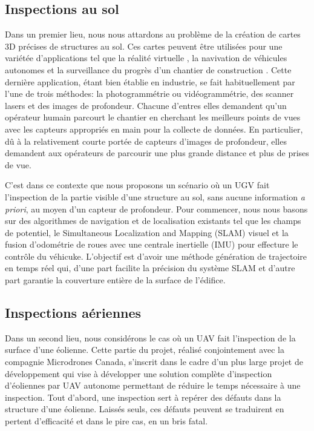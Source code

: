 \subsection{Inspections au sol}
Dans un premier lieu, nous nous attardons au problème de la création de cartes 3D précises de structures au sol. Ces cartes peuvent être utilisées pour une variétée d'applications tel que la réalité virtuelle \citep{googlevr2017}, la navivation de véhicules autonomes \citep{deepmap2017} et la surveillance du progrès d'un chantier de construction \citep{Omar2018}. Cette dernière application, étant bien établie en industrie, se fait habituellement par l'une de trois méthodes: la photogrammétrie ou vidéogrammétrie, des scanner lasers et des images de profondeur. Chacune d'entres elles demandent qu'un opérateur humain parcourt le chantier en cherchant les meilleurs points de vues avec les capteurs appropriés en main pour la collecte de données. En particulier, dû à la relativement courte portée de capteurs d'images de profondeur, elles demandent aux opérateurs de parcourir une plus grande distance et plus de prises de vue.

C'est dans ce contexte que nous proposons un scénario où un UGV fait l'inspection de la partie visible d'une structure au sol, sans aucune information \textit{a priori}, au moyen d'un capteur de profondeur. Pour commencer, nous nous basons sur des algorithmes de navigation et de localisation existants tel que les champs de potentiel, le Simultaneous Localization and Mapping (SLAM) visuel et la fusion d'odométrie de roues avec une centrale inertielle (IMU) pour effecture le contrôle du véhicuke. L'objectif est d'avoir une méthode génération de trajectoire en temps réel qui, d'une part facilite la précision du système SLAM et d'autre part garantie la couverture entière de la surface de l'édifice.

\subsection{Inspections aériennes}
Dans un second lieu, nous considérons le cas où un UAV fait l'inspection de la surface d'une éolienne. Cette partie du projet, réalisé conjointement avec la compagnie Microdrones Canada, s'inscrit dans le cadre d'un plus large projet de développement qui vise à développer une solution complète d'inspection d'éoliennes par UAV autonome permettant de réduire le temps nécessaire à une inspection. Tout d'abord, une inspection sert à repérer des défauts dans la structure d'une éolienne. Laissés seuls, ces défauts peuvent se traduirent en pertent d'efficacité et dans le pire cas, en un bris fatal.


